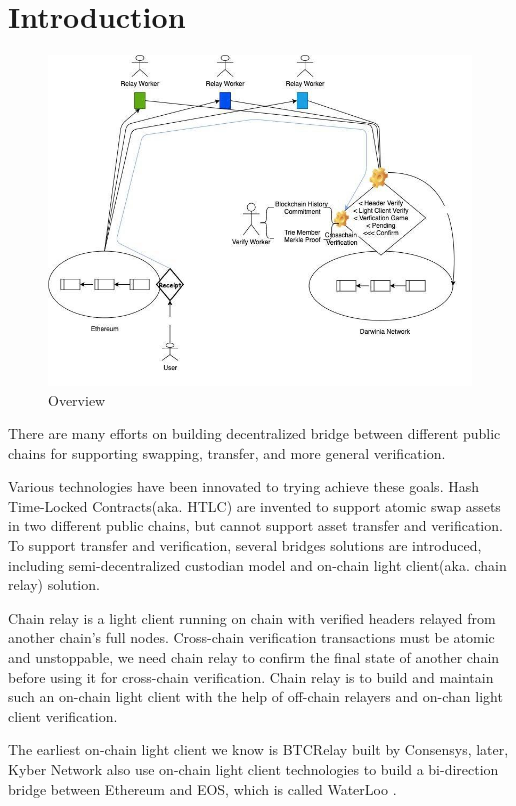 \section{Introduction}

\begin{figure}
    \centering
    \includegraphics[scale=0.5]{pic/overview.jpg}
    \caption{Overview}
    \label{fig:my_label}
\end{figure}


There are many efforts on building decentralized bridge between different public chains for supporting swapping, transfer, and more general verification.

Various technologies have been innovated to trying achieve these goals. Hash Time-Locked Contracts(aka. HTLC) are invented to support atomic swap assets in two different public chains, but cannot support asset transfer and verification. To support transfer and verification, several bridges solutions are introduced, including semi-decentralized custodian model and on-chain light client(aka. chain relay) solution.

Chain relay is a light client running on chain with verified headers relayed from another chain's full nodes. Cross-chain verification transactions must be atomic and unstoppable, we need chain relay to confirm the final state of another chain before using it for cross-chain verification. Chain relay is to build and maintain such an on-chain light client with the help of off-chain relayers and on-chan light client verification.

The earliest on-chain light client we know is BTCRelay \cite{btcrelay} built by Consensys, later, Kyber Network also use on-chain light client technologies to build a bi-direction bridge between Ethereum and EOS, which is called WaterLoo \cite{Waterloo}.

